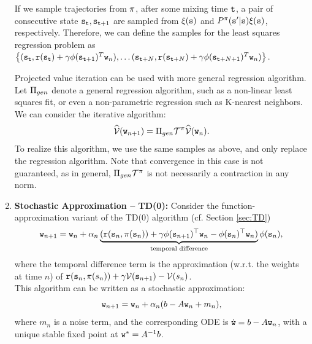 \begin{enumerate}
If we sample trajectories from $\pi$, after some mixing time ${\tt t}$, a pair of consecutive state ${\tt s}_{\tt t}, {\tt s}_{{\tt t}+1}$ are sampled from $\xi({\tt s})$ and $P^\pi({\tt s}'|{\tt s})\xi({\tt s})$, respectively. Therefore, we can define the samples for the least squares regression problem as $\left\{({\tt s}_{\tt t}, {\tt r}({\tt s}_{\tt t}) +\gamma \phi({\tt s}_{{\tt t}+1})^T {\tt w}_n), \dots  ({\tt s}_{{\tt t}+N}, {\tt r}({\tt s}_{{\tt t}+N}) +\gamma \phi({\tt s}_{{\tt t}+N+1})^T {\tt w}_n)\right\}$.


\begin{remark}
Projected value iteration can be used with more general regression algorithm. Let $\Pi_{gen}$ denote a general regression algorithm, such as a non-linear least squares fit, or even a non-parametric regression such as K-nearest neighbors. We can consider the iterative algorithm:
$$\widehat{\mathcal{V}}({\tt w}_{n+1}) = \Pi_{gen} \mathcal{T}^\pi \widehat{\mathcal{V}}({\tt w}_{n}).$$
To realize this algorithm, we use the same samples as above, and only replace the regression algorithm. Note that convergence in this case is not guaranteed, as in general, $\Pi_{gen} \mathcal{T}^\pi$ is not necessarily a contraction in any norm.
\end{remark}

\item \textbf{Stochastic Approximation -- TD(0):} Consider the function-approximation variant of the TD(0) algorithm (cf. Section \ref{sec:TD})
\begin{equation*}
    {\tt w}_{n+1} = {\tt w}_n + \alpha_n \underbrace{( {\tt r}({\tt s}_n,\pi({\tt s}_n)) +\gamma {\phi}({\tt s}_{n+1})^\top {\tt w}_n - {\phi}({\tt s}_{n})^\top {\tt w}_n)}_{\textrm{temporal difference}} \phi({\tt s}_{n}),
\end{equation*}
where the temporal difference term is the approximation (w.r.t. the weights at time $n$) of ${\tt r}({\tt s}_n,\pi(s_n)) +\gamma \mathcal{V}({\tt s}_{n+1}) - \mathcal{V}(s_n)$.
\\
This algorithm can be written as a stochastic approximation:
\begin{equation*}
    {\tt w}_{n+1} = {\tt w}_n + \alpha_n ( b -  A {\tt w}_n + m_n ),
\end{equation*}
where $m_n$ is a noise term, and the corresponding ODE is $\dot{{\tt w}} = b -  A {\tt w}_n$, with a unique stable fixed point at ${\tt w}^* = A^{-1}b$. 

\end{enumerate}
